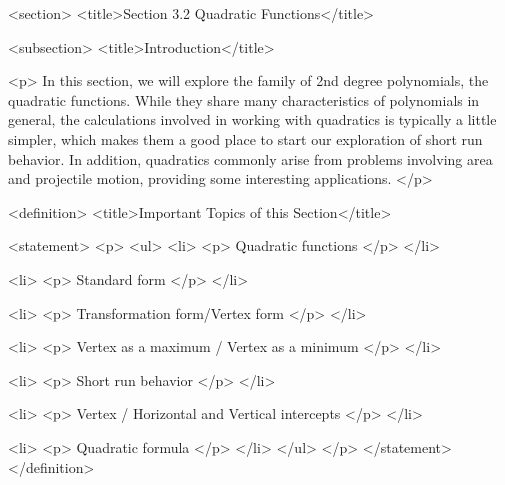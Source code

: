 <section>
    <title>Section 3.2 Quadratic Functions</title>

    <subsection>
        <title>Introduction</title>

        <p>
            In this section, we will explore the family of 2nd degree polynomials, the quadratic functions.
            While they share many characteristics of polynomials in general, the calculations involved in working with quadratics is typically a little simpler, which makes them a good place to start our exploration of short run behavior.
            In addition, quadratics commonly arise from problems involving area and projectile motion, providing some interesting applications.
        </p>

        <definition>
            <title>Important Topics of this Section</title>

            <statement>
                <p>
                    <ul>
                        <li>
                            <p>
                                Quadratic functions
                            </p>
                        </li>

                        <li>
                            <p>
                                Standard form
                            </p>
                        </li>

                        <li>
                            <p>
                                Transformation form/Vertex form
                            </p>
                        </li>

                        <li>
                            <p>
                                Vertex as a maximum / Vertex as a minimum
                            </p>
                        </li>

                        <li>
                            <p>
                                Short run behavior
                            </p>
                        </li>

                        <li>
                            <p>
                                Vertex / Horizontal and Vertical intercepts
                            </p>
                        </li>

                        <li>
                            <p>
                                Quadratic formula
                            </p>
                        </li>
                    </ul>
                </p>
            </statement>
        </definition>

